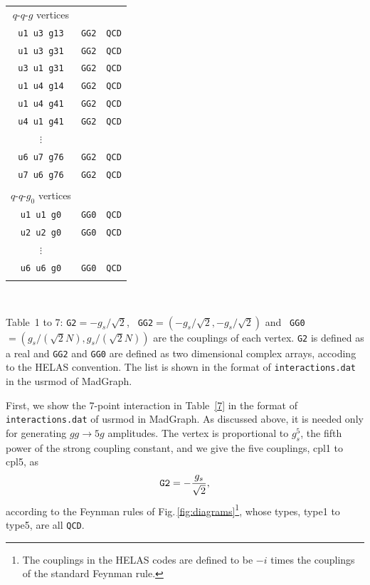 \documentclass[a4paper,11pt]{article}
\begin{document}
\begin{table}
\begin{center}
\begin{tabular}{ccc}
$q$-$q$-$g$ vertices\\
{\tt u1 u3 g13}&{\tt GG2}&{\tt QCD}\\
{\tt u1 u3 g31}&{\tt GG2}&{\tt QCD}\\
{\tt u3 u1 g31}&{\tt GG2}&{\tt QCD}\\
{\tt u1 u4 g14}&{\tt GG2}&{\tt QCD}\\
{\tt u1 u4 g41}&{\tt GG2}&{\tt QCD}\\
{\tt u4 u1 g41}&{\tt GG2}&{\tt QCD}\\
$\vdots$&&\\
{\tt u6 u7 g76}&{\tt GG2}&{\tt QCD}\\
{\tt u7 u6 g76}&{\tt GG2}&{\tt QCD}\\\\
\hspace{1.5em}$q$-$q$-$g_0$ vertices\\
{\tt u1 u1 g0}&{\tt GG0}&{\tt QCD}\\
{\tt u2 u2 g0}&{\tt GG0}&{\tt QCD}\\
$\vdots$&&\\
{\tt u6 u6 g0}&{\tt GG0}&{\tt QCD}\\\\
\hline
\hline
\end{tabular}\\
 \vspace{1em}
 \begin{flushleft}
Table~1 to 7: {\tt G2}$=-g_s/\sqrt{2}$, {\tt
 GG2}$=(-g_s/\sqrt{2},-g_s/\sqrt{2})$ and {\tt
 GG0}$=(g_s/(\sqrt{2}N),g_s/(\sqrt{2}N))$
 are the couplings of each
 vertex. {\tt G2} is defined as a real and {\tt GG2} and {\tt GG0} are
  defined as two dimensional complex arrays, accoding to the HELAS convention. The list
  is shown in the format of {\tt interactions.dat} in the usrmod of MadGraph\cite{MG/ME}.
  \end{flushleft}
 \label{tb:interactions}
\end{center}
\end{table}

First, we show the 7-point interaction in Table~\ref{7} in the format of
 {\tt
interactions.dat} of usrmod in MadGraph\cite{MG/ME}. As discussed above,
 it is needed  only for generating $gg\rightarrow 5g$ amplitudes. The vertex is
proportional to $g_s^5$, the fifth power of the strong coupling constant, and
we give the five couplings, cpl1 to cpl5, as
\begin{equation}
 {\tt G2} =-\frac{g_s}{\sqrt{2}},
\end{equation}
according to the Feynman rules of Fig.\,\ref{fig:diagrams}\footnote{The
couplings in the HELAS codes are defined to be $-i$ times the couplings
of the standard Feynman rule.}, whose
types, type1 to type5, are all {\tt QCD}.
\end{document}
